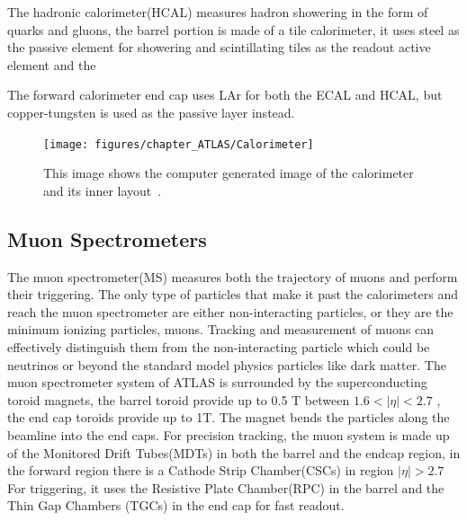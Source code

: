 The hadronic calorimeter(HCAL) measures hadron showering in the form of quarks and gluons, the barrel portion is made of a tile calorimeter, it uses steel as the passive element for showering and scintillating tiles as the readout active element and the 

The forward calorimeter end cap uses LAr for both the ECAL and HCAL, but copper-tungsten is used as the passive layer instead. 


\begin{figure}[!htb]
    \begin{center}
        \texttt{[image: figures/chapter\_ATLAS/Calorimeter]}
        \caption{
            This image shows the computer generated image of the calorimeter and its inner layout~\cite{Pequenao:1095927}.
        }
        \label{fig:Calorimeter}
    \end{center}
\end{figure}

\subsection{Muon Spectrometers}
The muon spectrometer(MS) measures both the trajectory of muons and perform their triggering. The only type of particles that make it past the calorimeters and reach the muon spectrometer are either non-interacting particles, or they are the minimum ionizing particles, muons. Tracking and measurement of muons can effectively distinguish them from the non-interacting particle which could be neutrinos or beyond the standard model physics particles like dark matter. 
The muon spectrometer system of ATLAS is surrounded by the superconducting toroid magnets, the barrel toroid provide up to 0.5 T between $1.6 < |\eta|<2.7$ , the end cap toroids provide up to 1T. The magnet bends the particles along the beamline into the end caps.
For precision tracking, the muon system is made up of the Monitored Drift Tubes(MDTs) in both the barrel and the endcap region, in the forward region there is a Cathode Strip Chamber(CSCs) in region $|\eta|>2.7$
For triggering, it uses the Resistive Plate Chamber(RPC) in the barrel and the Thin Gap Chambers (TGCs) in the end cap for fast readout. 


